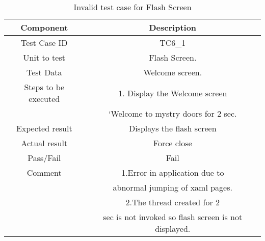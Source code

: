 \begin{table}[htb!]
\label{table : 11}
\centering %
\begin{tabular}{c c} %
\hline\hline %
 Component & Description \\ [0.5ex] %
\hline %
Test Case ID & TC6\_1   \\
Unit to test &Flash Screen. \\ 
Test Data &Welcome screen.\\
Steps to be executed &1. Display the Welcome screen\\
& ‘Welcome to mystry doors for 2 sec.\\


Expected result  &Displays the flash screen\\ 
Actual result &Force close\\
Pass/Fail &Fail\\
Comment &1.Error in application due to \\
&abnormal jumping of xaml pages.\\
&2.The thread created for 2 \\
&sec is not invoked so flash screen is not displayed.\\

\hline %
\end{tabular}
\caption{Invalid test case for  Flash Screen} \label{table:tc11} %
\end{table}

